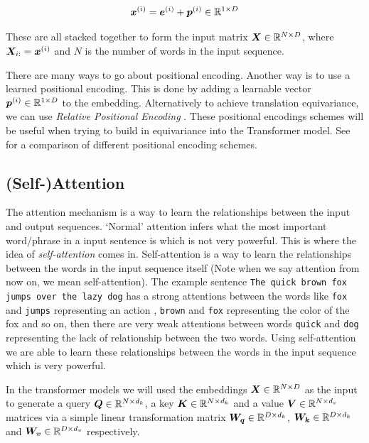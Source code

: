 \documentclass[../main.tex]{subfiles}
\begin{document}
\begin{equation}
	\bm{x}^{(i)} =  \bm{e}^{(i)} + \bm{p}^{(i)} \in \mathbb{R}^{1 \times D}
\end{equation}

\noi These are all stacked together to form the input matrix $\bm{X} \in \mathbb{R}^{N \times D}$, where $\bm{X}_{i:} = \bm{x}^{(i)}$ and $N$ is the number of words in the input sequence.

\begin{note}
	There are many ways to go about positional encoding. Another way is to use a learned positional encoding. This is done by adding a learnable vector $\bm{p}^{(i)} \in \mathbb{R}^{1 \times D}$ to the embedding. Alternatively to achieve translation equivariance, we can use \emph{Relative Positional Encoding} \cite{shaw2018selfattention, wu2021rethinking}. These positional encodings schemes will be useful when trying to build in equivariance into the Transformer model. See 
	\cite{kazemnejad2019:pencoding} for a comparison of different positional encoding schemes.
\end{note}


\subsection{(Self-)Attention}

The attention mechanism is a way to learn the relationships between the input and output sequences. `Normal' attention infers what the most important word/phrase in a input sentence is which is not very powerful. This is where the idea of \emph{self-attention} comes in. Self-attention is a way to learn the relationships between the words in the input sequence itself (Note when we say attention from now on, we mean self-attention).  The example sentence \texttt{The quick brown fox jumps over the lazy dog} has a strong attentions between the words like \texttt{fox} and \texttt{jumps} representing an action , \texttt{brown} and \texttt{fox} representing the color of the fox and so on, then there are very weak attentions between words \texttt{quick} and \texttt{dog} representing the lack of relationship between the two words. Using self-attention we are able to learn these relationships between the words in the input sequence which is very powerful.

In the transformer models we will used the embeddings $\bm{X} \in \mathbb{R}^{N \times D}$ as the input to generate a query $\bm{Q} \in \mathbb{R}^{N \times d_k}$, a key $\bm{K} \in \mathbb{R}^{N \times d_k}$ and a value $\bm{V} \in \mathbb{R}^{N \times d_v}$ matrices via a simple linear transformation matrix $\bm{W_q} \in \mathbb{R}^{D \times d_k}$, $\bm{W_k} \in \mathbb{R}^{D \times d_k}$ and $\bm{W_v} \in \mathbb{R}^{D \times d_v}$ respectively. 
\end{document}
